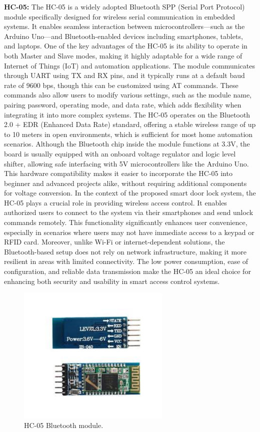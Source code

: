 \documentclass[conference, onecolumn]{IEEEtran}
\begin{document}
 \textbf{HC-05:} The HC-05 is a widely adopted Bluetooth SPP (Serial Port Protocol) module specifically designed for wireless serial communication in embedded systems. It enables seamless interaction between microcontrollers—such as the Arduino Uno—and Bluetooth-enabled devices including smartphones, tablets, and laptops. One of the key advantages of the HC-05 is its ability to operate in both Master and Slave modes, making it highly adaptable for a wide range of Internet of Things (IoT) and automation applications. The module communicates through UART using TX and RX pins, and it typically runs at a default baud rate of 9600 bps, though this can be customized using AT commands. These commands also allow users to modify various settings, such as the module name, pairing password, operating mode, and data rate, which adds flexibility when integrating it into more complex systems.
 The HC-05 operates on the Bluetooth 2.0 + EDR (Enhanced Data Rate) standard, offering a stable wireless range of up to 10 meters in open environments, which is sufficient for most home automation scenarios. Although the Bluetooth chip inside the module functions at 3.3V, the board is usually equipped with an onboard voltage regulator and logic level shifter, allowing safe interfacing with 5V microcontrollers like the Arduino Uno. This hardware compatibility makes it easier to incorporate the HC-05 into beginner and advanced projects alike, without requiring additional components for voltage conversion.
 In the context of the proposed smart door lock system, the HC-05 plays a crucial role in providing wireless access control. It enables authorized users to connect to the system via their smartphones and send unlock commands remotely. This functionality significantly enhances user convenience, especially in scenarios where users may not have immediate access to a keypad or RFID card. Moreover, unlike Wi-Fi or internet-dependent solutions, the Bluetooth-based setup does not rely on network infrastructure, making it more resilient in areas with limited connectivity. The low power consumption, ease of configuration, and reliable data transmission make the HC-05 an ideal choice for enhancing both security and usability in smart access control systems.
 
\begin{figure}[H]
	\centering
	\includegraphics[width=0.65\textwidth]{HC_05.pdf}
	\caption{HC-05 Bluetooth module.}
	\label{fig}
\end{figure}
	
\end{document}
